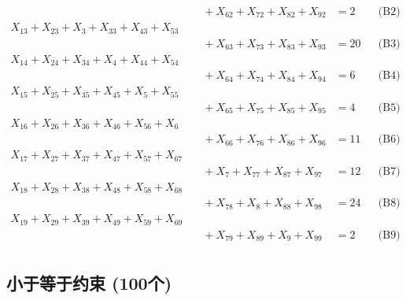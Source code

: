 \documentclass[a4paper,10pt]{article}
\begin{document}
{\begin{align}
&\quad  + X_{62} + X_{72} + X_{82} + X_{92} &= 2 && \text{(B2)} \\
X_{13} + X_{23} + X_{3} + X_{33} + X_{43} + X_{53} \\[0.5ex]
&\quad  + X_{63} + X_{73} + X_{83} + X_{93} &= 20 && \text{(B3)} \\
X_{14} + X_{24} + X_{34} + X_{4} + X_{44} + X_{54} \\[0.5ex]
&\quad  + X_{64} + X_{74} + X_{84} + X_{94} &= 6 && \text{(B4)} \\
X_{15} + X_{25} + X_{35} + X_{45} + X_{5} + X_{55} \\[0.5ex]
&\quad  + X_{65} + X_{75} + X_{85} + X_{95} &= 4 && \text{(B5)} \\
X_{16} + X_{26} + X_{36} + X_{46} + X_{56} + X_{6} \\[0.5ex]
&\quad  + X_{66} + X_{76} + X_{86} + X_{96} &= 11 && \text{(B6)} \\
X_{17} + X_{27} + X_{37} + X_{47} + X_{57} + X_{67} \\[0.5ex]
&\quad  + X_{7} + X_{77} + X_{87} + X_{97} &= 12 && \text{(B7)} \\
X_{18} + X_{28} + X_{38} + X_{48} + X_{58} + X_{68} \\[0.5ex]
&\quad  + X_{78} + X_{8} + X_{88} + X_{98} &= 24 && \text{(B8)} \\
X_{19} + X_{29} + X_{39} + X_{49} + X_{59} + X_{69} \\[0.5ex]
&\quad  + X_{79} + X_{89} + X_{9} + X_{99} &= 2 && \text{(B9)} \\
\allowbreak
\end{align}}

\subsection{小于等于约束 (100个)}
\end{document}
